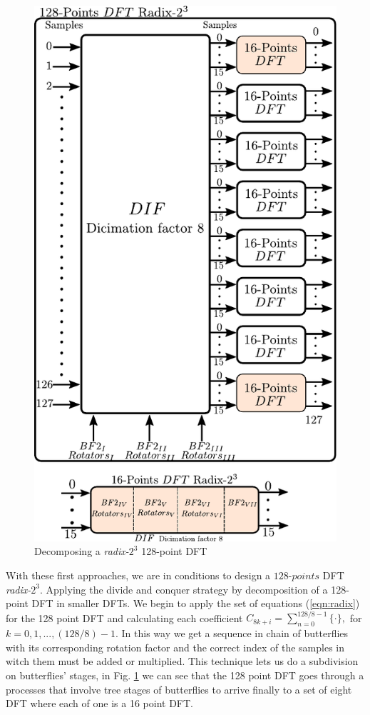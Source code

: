 \documentclass[journal,comsoc]{IEEEtran}
\begin{document}
\begin{figure}[t!]
	\centering
	\includegraphics[width=0.81\linewidth]{Diagramas/miSeccionFiguras/BloquesDft.pdf}
	\caption{Decomposing a \textit{radix-}$2^3$ 128-point DFT	}
	\label{fig:bloquesdft}
\end{figure}
With these first approaches, we are in conditions to design a $128$-$points$ DFT \textit{radix-}$2^3$. Applying the divide and conquer strategy by decomposition of a 128-point DFT in smaller DFTs. We begin to apply the set of equations (\ref{eqn:radix}) for the 128 point DFT and calculating each coefficient $C_{8k+i} = \sum_{n=0}^{128/8-1} \{ \cdot \}, $ for $k=0,1,...,(128/8)-1$. In this way we get a sequence in chain of butterflies with its corresponding rotation factor and the correct index of the samples in witch them must be added or multiplied. This technique lets us do a subdivision on butterflies' stages, in Fig. \ref{fig:bloquesdft} we can see that the 128 point DFT goes through a processes that involve tree stages of butterflies to arrive finally to a set of eight DFT where each of one is a 16 point DFT.
\end{document}
